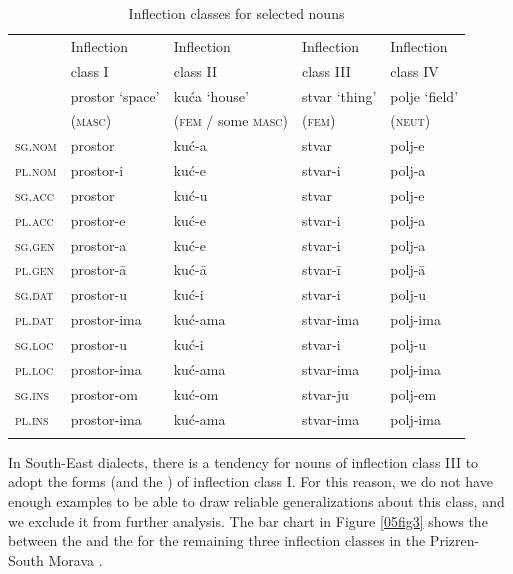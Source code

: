 \documentclass[output=paper,colorlinks,citecolor=brown]{langscibook}
\begin{document}
\begin{table}[ht]
	\centering
	\caption{Inflection classes for selected nouns}
	\label{05tab3}
	\begin{tabularx}{\textwidth}{lllll}
		\lsptoprule
		& Inflection & Inflection & Inflection & Inflection  \\
		& class I & class II & class III & class IV \\
		\midrule
		& prostor ‘space’ & kuća ‘house’ & stvar ‘thing’ & polje ‘field’ \\
		& (\textsc{masc}) & (\textsc{fem} / some \textsc{masc}) & (\textsc{fem}) & (\textsc{neut}) \\
		\midrule
		\textsc{sg.nom} & prostor & kuć-a & stvar & polj-e \\
		\textsc{pl.nom} & prostor-i & kuć-e & stvar-i & polj-a \\
		\textsc{sg.acc} & prostor & kuć-u & stvar & polj-e \\
		\textsc{pl.acc} & prostor-e & kuć-e & stvar-i & polj-a \\
		\textsc{sg.gen} & prostor-a & kuć-e & stvar-i & polj-a \\
		\textsc{pl.gen} & prostor-ā & kuć-ā & stvar-ī & polj-ā \\
		\textsc{sg.dat} & prostor-u & kuć-i & stvar-i & polj-u \\
		\textsc{pl.dat} & prostor-ima & kuć-ama & stvar-ima & polj-ima \\
		\textsc{sg.loc} & prostor-u & kuć-i & stvar-i & polj-u \\
		\textsc{pl.loc} & prostor-ima & kuć-ama & stvar-ima & polj-ima \\
		\textsc{sg.ins} & prostor-om & kuć-om & stvar-ju & polj-em \\
		\textsc{pl.ins} & prostor-ima & kuć-ama & stvar-ima & polj-ima \\
		\lspbottomrule
	\end{tabularx}
\end{table}

In South-East  dialects, there is a tendency for nouns of inflection class III to adopt the forms (and the ) of inflection class I. For this reason, we do not have enough examples to be able to draw reliable generalizations about this class, and we exclude it from further analysis. The bar chart in Figure \ref{05fig3} shows the  between the  and the  for the remaining three inflection classes in the Prizren-South Morava .
\end{document}
